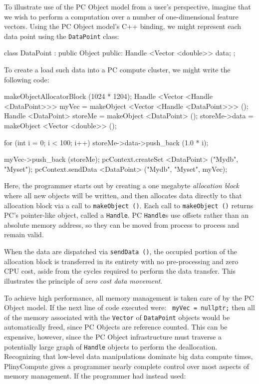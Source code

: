 To illustrate use of the PC Object model from a user's perspective,
imagine that we wish to perform a computation over a number of one-dimensional feature vectors.  
Using the PC Object model's C++ binding, we might represent each data point using the 
\texttt{DataPoint} class:

\begin{codesmall}
class DataPoint : public Object {
public:
	Handle <Vector <double>> data;
};
\end{codesmall}

\noindent
To create a load such data into a PC compute cluster, we might write the following code:

\begin{codesmall}
makeObjectAllocatorBlock (1024 * 1204);
Handle <Vector <Handle <DataPoint>>> myVec = 
     makeObject <Vector <Handle <DataPoint>>> ();
Handle <DataPoint> storeMe = makeObject <DataPoint> ();
storeMe->data = makeObject <Vector <double>> ();

for (int i = 0; i < 100; i++) 
     storeMe->data->push_back (1.0 * i);

myVec->push_back (storeMe);
pcContext.createSet <DataPoint> ("Mydb", "Myset");
pcContext.sendData <DataPoint> ("Mydb", "Myset", myVec);
\end{codesmall}

\noindent
Here, the programmer starts out by creating a one megabyte \emph{allocation block} where all new objects will be written,
and then allocates data directly to that allocation block via a call to \texttt{makeObject ()}.  Each call to  \texttt{makeObject ()}
returns PC's pointer-like object, called a \texttt{Handle}.  PC \texttt{Handle}s use offsets rather than an absolute memory
address, so they can be moved from process to process and remain valid.  

When the data are dispatched via \texttt{sendData ()},
the occupied
portion of the allocation block is transferred in its entirety with
no pre-processing and zero CPU cost, aside from the cycles required to perform the data transfer.  
This illustrates the principle of \emph{zero cost data movement}.

To achieve high performance, all memory management is taken care of by the PC Object model.
If the next line of code executed were:
\texttt{
myVec = nullptr;}
then all of the memory associated with the \texttt{Vector} of \texttt{DataPoint} objects would be automatically
freed, since PC Objects are reference counted.  This can
be expensive, however, since the PC Object infrastructure must traverse a potentially large graph of \texttt{Handle} objects to perform the deallocation.  
Recognizing that low-level data manipulations dominate big data compute times, PlinyCompute gives a programmer nearly complete control over most aspects of memory management.
If the 
programmer had instead used: 

